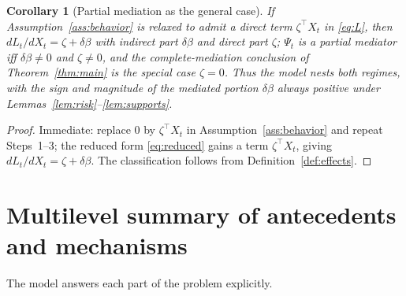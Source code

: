 \documentclass{amsart}
\newtheorem{corollary}{Corollary}
\theoremstyle{definition}
\theoremstyle{remark}
\begin{document}
\begin{corollary}[Partial mediation as the general case]\label{cor:partial}
If Assumption~\ref{ass:behavior} is relaxed to admit a direct term
$\zeta^\top X_t$ in \eqref{eq:L}, then
$dL_t/dX_t=\zeta+\delta\beta$ with indirect part $\delta\beta$ and direct
part $\zeta$; $\Psi_t$ is a \emph{partial} mediator iff $\delta\beta\neq0$
and $\zeta\neq0$, and the complete-mediation conclusion of
Theorem~\ref{thm:main} is the special case $\zeta=0$. Thus the model
nests both regimes, with the sign and magnitude of the mediated portion
$\delta\beta$ always positive under
Lemmas~\ref{lem:risk}--\ref{lem:supports}.
\end{corollary}

\begin{proof}
Immediate: replace $0$ by $\zeta^\top X_t$ in
Assumption~\ref{ass:behavior} and repeat Steps~1--3; the reduced form
\eqref{eq:reduced} gains a term $\zeta^\top X_t$, giving
$dL_t/dX_t=\zeta+\delta\beta$. The classification follows from
Definition~\ref{def:effects}.
\end{proof}

\section{Multilevel summary of antecedents and mechanisms}

The model answers each part of the problem explicitly.
\end{document}
